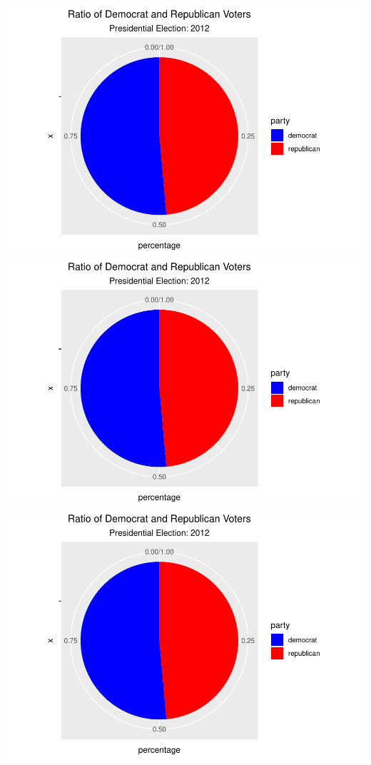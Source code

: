 \documentclass[
]{article}
\begin{document}
\includegraphics{election_files/figure-latex/anim-85.pdf}
\includegraphics{election_files/figure-latex/anim-86.pdf}
\includegraphics{election_files/figure-latex/anim-87.pdf}
\end{document}
